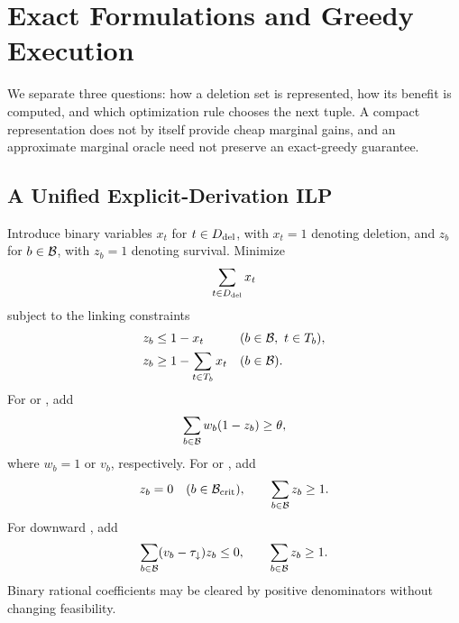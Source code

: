 \section{Exact Formulations and Greedy Execution}
\label{sec:algorithms}

We separate three questions: how a deletion set is represented, how its
benefit is computed, and which optimization rule chooses the next tuple.
A compact representation does not by itself provide cheap marginal gains,
and an approximate marginal oracle need not preserve an exact-greedy
guarantee.

\subsection{A Unified Explicit-Derivation ILP}
\label{sec:ilp}

Introduce binary variables $x_t$ for $t\in D_{\mathrm{del}}$, with $x_t=1$ denoting
deletion, and $z_b$ for $b\in\mathcal{B}$, with $z_b=1$ denoting survival.
Minimize
\begin{equation}
\label{eq:ilp-objective}
\sum_{t\in D_{\mathrm{del}}}x_t
\end{equation}
subject to the linking constraints
\begin{align}
 z_b&\le 1-x_t &&(b\in\mathcal{B},\ t\in T_b),\label{eq:ilp-upper}\\
 z_b&\ge 1-\sum_{t\in T_b}x_t &&(b\in\mathcal{B}).\label{eq:ilp-lower}
\end{align}
For  or , add
\begin{equation}
\label{eq:ilp-coverage}
\sum_{b\in\mathcal{B}}w_b(1-z_b)\ge\theta,
\end{equation}
where $w_b=1$ or $v_b$, respectively. For  or , add
\begin{equation}
\label{eq:ilp-extrema}
z_b=0\quad(b\in\mathcal{B}_{\mathrm{crit}}),
\qquad \sum_{b\in\mathcal{B}}z_b\ge1.
\end{equation}
For downward , add
\begin{equation}
\label{eq:ilp-avg}
\sum_{b\in\mathcal{B}}(v_b-\tau_{\downarrow})z_b\le0,
\qquad \sum_{b\in\mathcal{B}}z_b\ge1.
\end{equation}
Binary rational coefficients may be cleared by positive denominators
without changing feasibility.

